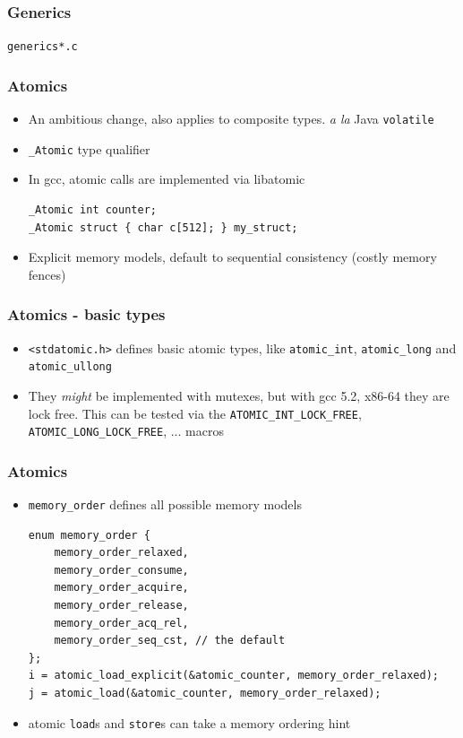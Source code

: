 \documentclass{beamer}
\begin{document}
\begin{frame}
	\frametitle{Generics}
	\texttt{generics*.c}
\end{frame}

\begin{frame}[fragile]
	\frametitle{Atomics}
	\begin{itemize}
		\item An ambitious change, also applies to composite types. \textit{a la} Java \texttt{volatile}
		\item \texttt{\_Atomic} type qualifier
		\item In gcc, atomic calls are implemented via libatomic
			\begin{lstlisting}
_Atomic int counter;
_Atomic struct { char c[512]; } my_struct;
			\end{lstlisting}
		\item Explicit memory models, default to sequential consistency (costly memory fences)
	\end{itemize}
\end{frame}

\begin{frame}[fragile]
	\frametitle{Atomics - basic types}
	\begin{itemize}
	\item \texttt{<stdatomic.h>} defines basic atomic types, like \texttt{atomic\_int}, \texttt{atomic\_long} and \texttt{atomic\_ullong}
	\item They \textit{might} be implemented with mutexes, but with gcc 5.2,  x86-64 they are lock free. This can be tested via the \texttt{ATOMIC\_INT\_LOCK\_FREE}, \texttt{ATOMIC\_LONG\_LOCK\_FREE}, ... macros
	\end{itemize}
\end{frame}


\begin{frame}[fragile]
	\frametitle{Atomics}
	\begin{itemize}
	\item \texttt{memory\_order} defines all possible memory models
	\begin{lstlisting}
enum memory_order {
	memory_order_relaxed,
	memory_order_consume,
	memory_order_acquire,
	memory_order_release,
	memory_order_acq_rel,
	memory_order_seq_cst, // the default
};
i = atomic_load_explicit(&atomic_counter, memory_order_relaxed);
j = atomic_load(&atomic_counter, memory_order_relaxed);
	\end{lstlisting}
	\item atomic \texttt{load}s and \texttt{store}s can take a memory ordering hint
	\end{itemize}
\end{frame}
\end{document}
